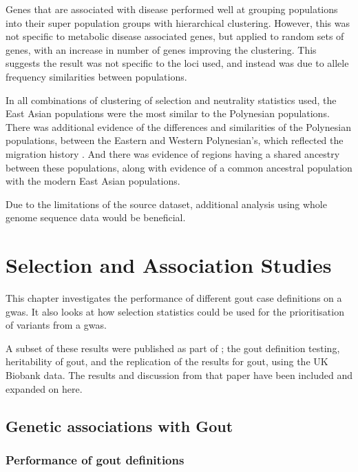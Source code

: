 \documentclass[]{report}
\begin{document}
Genes that are associated with disease performed well at grouping
populations into their super population groups with hierarchical
clustering. However, this was not specific to metabolic disease
associated genes, but applied to random sets of genes, with an increase
in number of genes improving the clustering. This suggests the result
was not specific to the loci used, and instead was due to allele
frequency similarities between populations.

In all combinations of clustering of selection and neutrality statistics
used, the East Asian populations were the most similar to the Polynesian
populations. There was additional evidence of the differences and
similarities of the Polynesian populations, between the Eastern and
Western Polynesian's, which reflected the migration history . And there
was evidence of regions having a shared ancestry between these
populations, along with evidence of a common ancestral population with
the modern East Asian populations.

Due to the limitations of the source dataset, additional analysis using
whole genome sequence data would be beneficial.

\chapter{Selection and Association Studies}\label{selGwas}

\glsresetall

This chapter investigates the performance of different gout case
definitions on a \gls{gwas}. It also looks at how selection statistics
could be used for the prioritisation of variants from a \gls{gwas}.

A subset of these results were published as part of \citet{Cadzow2017};
the gout definition testing, heritability of gout, and the replication
of the \citet{Kottgen2013} results for gout, using the UK Biobank data.
The results and discussion from that paper have been included and
expanded on here.

\section{Genetic associations with
Gout}\label{genetic-associations-with-gout}

\subsection{Performance of gout
definitions}\label{performance-of-gout-definitions}
\end{document}
